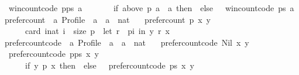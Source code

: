 \begin{isabellebody}
\ \ {\isachardoublequoteopen}win{\isacharunderscore}{\kern0pt}count{\isacharunderscore}{\kern0pt}code\ {\isacharparenleft}{\kern0pt}p{\isacharhash}{\kern0pt}ps{\isacharparenright}{\kern0pt}\ a\ {\isacharequal}{\kern0pt}\isanewline
\ \ \ \ \ \ {\isacharparenleft}{\kern0pt}if\ {\isacharparenleft}{\kern0pt}above\ p\ a\ {\isacharequal}{\kern0pt}\ {\isacharbraceleft}{\kern0pt}a{\isacharbraceright}{\kern0pt}{\isacharparenright}{\kern0pt}\ then\ {}\ else\ {}{\isacharparenright}{\kern0pt}\ {\isacharplus}{\kern0pt}\ win{\isacharunderscore}{\kern0pt}count{\isacharunderscore}{\kern0pt}code\ ps\ a{\isachardoublequoteclose}\isanewline
\isanewline
{}\isamarkupfalse%
\ prefer{\isacharunderscore}{\kern0pt}count\ {\isacharcolon}{\kern0pt}{\isacharcolon}{\kern0pt}\ {\isachardoublequoteopen}{\isacharprime}{\kern0pt}a\ Profile\ {\isasymRightarrow}\ {\isacharprime}{\kern0pt}a\ {\isasymRightarrow}\ {\isacharprime}{\kern0pt}a\ {\isasymRightarrow}\ nat{\isachardoublequoteclose}\ \isanewline
\ \ {\isachardoublequoteopen}prefer{\isacharunderscore}{\kern0pt}count\ p\ x\ y\ {\isacharequal}{\kern0pt}\isanewline
\ \ \ \ \ \ card\ {\isacharbraceleft}{\kern0pt}i{\isacharcolon}{\kern0pt}{\isacharcolon}{\kern0pt}nat{\isachardot}{\kern0pt}\ i\ {\isacharless}{\kern0pt}\ size\ p\ {\isasymand}\ {\isacharparenleft}{\kern0pt}let\ r\ {\isacharequal}{\kern0pt}\ {\isacharparenleft}{\kern0pt}p{\isacharbang}{\kern0pt}i{\isacharparenright}{\kern0pt}\ in\ {\isacharparenleft}{\kern0pt}y\ {\isasympreceq}\isactrlsub r\ x{\isacharparenright}{\kern0pt}{\isacharparenright}{\kern0pt}{\isacharbraceright}{\kern0pt}{\isachardoublequoteclose}\isanewline
\isanewline
{}\isamarkupfalse%
\ prefer{\isacharunderscore}{\kern0pt}count{\isacharunderscore}{\kern0pt}code\ {\isacharcolon}{\kern0pt}{\isacharcolon}{\kern0pt}\ {\isachardoublequoteopen}{\isacharprime}{\kern0pt}a\ Profile\ {\isasymRightarrow}\ {\isacharprime}{\kern0pt}a\ {\isasymRightarrow}\ {\isacharprime}{\kern0pt}a\ {\isasymRightarrow}\ nat{\isachardoublequoteclose}\ \isanewline
\ \ {\isachardoublequoteopen}prefer{\isacharunderscore}{\kern0pt}count{\isacharunderscore}{\kern0pt}code\ Nil\ x\ y\ {\isacharequal}{\kern0pt}\ {}{\isachardoublequoteclose}\ {\isacharbar}{\kern0pt}\isanewline
\ \ {\isachardoublequoteopen}prefer{\isacharunderscore}{\kern0pt}count{\isacharunderscore}{\kern0pt}code\ {\isacharparenleft}{\kern0pt}p{\isacharhash}{\kern0pt}ps{\isacharparenright}{\kern0pt}\ x\ y\ {\isacharequal}{\kern0pt}\isanewline
\ \ \ \ \ \ {\isacharparenleft}{\kern0pt}if\ y\ {\isasympreceq}\isactrlsub p\ x\ then\ {}\ else\ {}{\isacharparenright}{\kern0pt}\ {\isacharplus}{\kern0pt}\ prefer{\isacharunderscore}{\kern0pt}count{\isacharunderscore}{\kern0pt}code\ ps\ x\ y{\isachardoublequoteclose}\isanewline

\end{isabellebody}
